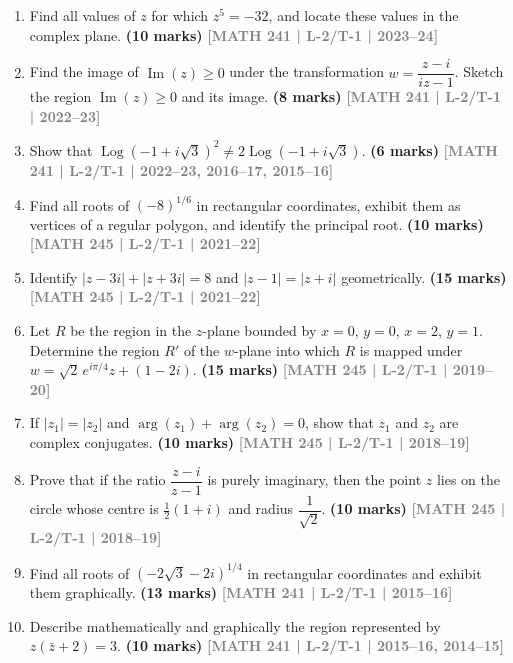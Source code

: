 \documentclass[12pt]{article}
\newcommand{\yr}[1]{\hfill\textcolor{gray}{\small\textbf{[#1]}}}
\newcommand{\mk}[1]{\textcolor{orange!70!black}{\small\textbf{(#1 marks)}}}
\begin{document}
\begin{enumerate}

\item Find all values of $z$ for which $z^{5}=-32$, and locate these values in the complex plane.
\mk{10} \yr{MATH 241 | L-2/T-1 | 2023--24}

\item Find the image of $\operatorname{Im}(z)\ge 0$ under the transformation $w=\dfrac{z-i}{iz-1}$. Sketch the region $\operatorname{Im}(z)\ge 0$ and its image.
\mk{8} \yr{MATH 241 | L-2/T-1 | 2022--23}

\item Show that $\operatorname{Log}(-1+i\sqrt{3})^{2}\neq 2\operatorname{Log}(-1+i\sqrt{3})$.
\mk{6} \yr{MATH 241 | L-2/T-1 | 2022--23, 2016--17, 2015--16}

\item Find all roots of $(-8)^{1/6}$ in rectangular coordinates, exhibit them as vertices of a regular polygon, and identify the principal root.
\mk{10} \yr{MATH 245 | L-2/T-1 | 2021--22}

\item Identify $|z-3i|+|z+3i|=8$ and $|z-1|=|z+i|$ geometrically.
\mk{15} \yr{MATH 245 | L-2/T-1 | 2021--22}

\item Let $R$ be the region in the $z$-plane bounded by $x=0$, $y=0$, $x=2$, $y=1$. Determine the region $R'$ of the $w$-plane into which $R$ is mapped under $w=\sqrt{2}\,e^{i\pi/4}z+(1-2i)$.
\mk{15} \yr{MATH 245 | L-2/T-1 | 2019--20}

\item If $|z_{1}|=|z_{2}|$ and $\arg(z_{1})+\arg(z_{2})=0$, show that $z_{1}$ and $z_{2}$ are complex conjugates.
\mk{10} \yr{MATH 245 | L-2/T-1 | 2018--19}

\item Prove that if the ratio $\dfrac{z-i}{z-1}$ is purely imaginary, then the point $z$ lies on the circle whose centre is $\tfrac{1}{2}(1+i)$ and radius $\dfrac{1}{\sqrt{2}}$.
\mk{10} \yr{MATH 245 | L-2/T-1 | 2018--19}

\item Find all roots of $(-2\sqrt{3}-2i)^{1/4}$ in rectangular coordinates and exhibit them graphically.
\mk{13} \yr{MATH 241 | L-2/T-1 | 2015--16}

\item Describe mathematically and graphically the region represented by $z(\bar{z}+2)=3$.
\mk{10} \yr{MATH 241 | L-2/T-1 | 2015--16, 2014--15}


\end{enumerate}
\end{document}
